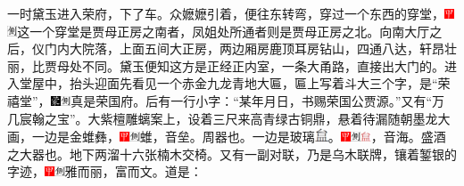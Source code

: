 一时黛玉进入荣府，下了车。众嬷嬷引着，便往东转弯，穿过一个东西的穿堂，{\includegraphics[width=3mm]{../Images/00002}\includegraphics[width=3mm]{../Images/00011}\footnotesize \kaishu 这一个穿堂是贾母正房之南者，凤姐处所通者则是贾母正房之北。}向南大厅之后，仪门内大院落，上面五间大正房，两边厢房鹿顶耳房钻山，四通八达，轩昂壮丽，比贾母处不同。黛玉便知这方是正经正内室，一条大甬路，直接出大门的。进入堂屋中，抬头迎面先看见一个赤金九龙青地大匾，匾上写着斗大三个字，是``荣禧堂''，{\includegraphics[width=3mm]{../Images/00006}\includegraphics[width=3mm]{../Images/00011}\footnotesize \kaishu 真是荣国府。}后有一行小字：``某年月日，书赐荣国公贾源。''又有``万几宸翰之宝''。大紫檀雕螭案上，设着三尺来高青绿古铜鼎，悬着待漏随朝墨龙大画，一边是金蜼彝，{\includegraphics[width=3mm]{../Images/00002}\includegraphics[width=3mm]{../Images/00011}\footnotesize \kaishu 蜼，音垒。周器也。}一边是玻璃\includegraphics[width=4mm]{../Images/00013}。{{{\includegraphics[width=3mm]{../Images/00002}\includegraphics[width=3mm]{../Images/00011}\footnotesize \kaishu }{\includegraphics[width=3mm]{../Images/00014}，音海。盛酒之大器也。}}}地下两溜十六张楠木交椅。又有一副对联，乃是乌木联牌，镶着錾银的字迹，{\includegraphics[width=3mm]{../Images/00002}\includegraphics[width=3mm]{../Images/00011}\footnotesize \kaishu 雅而丽，富而文。}道是：

